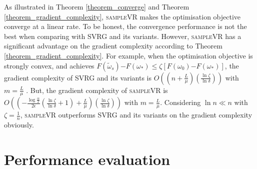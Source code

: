 \documentclass[letterpaper]{article}
\begin{document}
 As illustrated in Theorem \ref{theorem_converge} and Theorem \ref{theorem_gradient_complexity}, \textsc{sampleVR} makes the optimisation objective converge at a linear rate. To be honest,  the convergence performance is  not the best when comparing with SVRG and its variants. However, \textsc{sampleVR}
 has a significant advantage on the gradient complexity according to Theorem \ref{theorem_gradient_complexity}. For example, when the optimisation objective is strongly convex, and achieves $F(\tilde{\omega}_s)\mathrm{-}F(\omega_\ast) \le \zeta [F(\omega_0)\mathrm{-}F(\omega_\ast)]$, the gradient complexity of SVRG and its variants is $O\left(\left(n+\frac{L}{\mu}\right)\left( \frac{\ln \zeta}{\ln \delta}\right)\right)$ with $m=\frac{L}{\mu}$ \cite{Allen2015UniVR}. But, the gradient complexity of \textsc{sampleVR}  is $O\left(\left(\mathrm{-} \frac{\log\frac{\alpha}{2}}{2\epsilon} (\frac{\ln \zeta}{\ln \delta}+1)+\frac{L}{\mu} \right )\left( \frac{\ln \zeta}{\ln \delta}\right)  \right)$ with $m=\frac{L}{\mu}$. Considering $\ln n \ll n$ with $\zeta=\frac{1}{n}$, \textsc{sampleVR}  outperforms SVRG and its variants on the gradient complexity obviously.



\section{Performance evaluation}
\label{sect_performance_evaluation}

\end{document}
